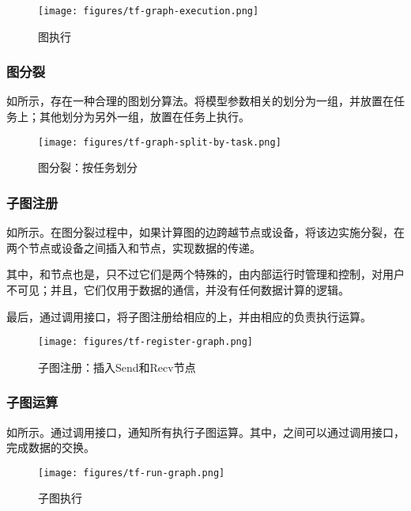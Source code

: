 \begin{content}
\begin{figure}[!htbp]
\centering
\texttt{[image: figures/tf-graph-execution.png]}
\caption{图执行}
 \label{fig:tf-graph-execution}
\end{figure}

\subsubsection{图分裂}

如所示，存在一种合理的图划分算法。将模型参数相关的划分为一组，并放置在任务上；其他划分为另外一组，放置在任务上执行。

\begin{figure}[!htbp]
\centering
\texttt{[image: figures/tf-graph-split-by-task.png]}
\caption{图分裂：按任务划分}
 \label{fig:tf-graph-split-by-task}
\end{figure}

\subsubsection{子图注册}

如所示。在图分裂过程中，如果计算图的边跨越节点或设备，将该边实施分裂，在两个节点或设备之间插入和节点，实现数据的传递。

其中，和节点也是，只不过它们是两个特殊的，由内部运行时管理和控制，对用户不可见；并且，它们仅用于数据的通信，并没有任何数据计算的逻辑。

最后，通过调用接口，将子图注册给相应的上，并由相应的负责执行运算。

\begin{figure}[!htbp]
\centering
\texttt{[image: figures/tf-register-graph.png]}
\caption{子图注册：插入Send和Recv节点}
 \label{fig:tf-register-graph}
\end{figure}

\subsubsection{子图运算}

如所示。通过调用接口，通知所有执行子图运算。其中，之间可以通过调用接口，完成数据的交换。

\begin{figure}[!htbp]
\centering
\texttt{[image: figures/tf-run-graph.png]}
\caption{子图执行}
 \label{fig:tf-run-graph}
\end{figure}

\end{content}

